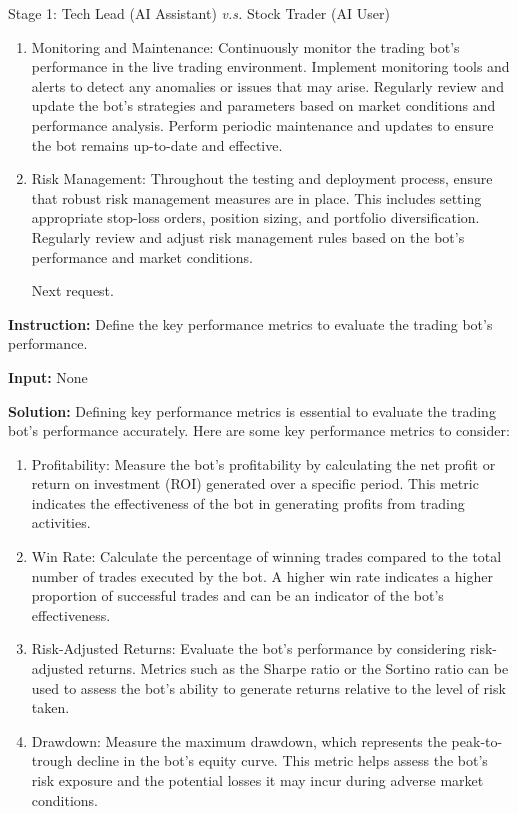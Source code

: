 \begin{AIBoxBreak}{Stage 1: Tech Lead (AI Assistant) \textit{v.s.} Stock Trader (AI User)}
\begin{enumerate}
\item  Monitoring and Maintenance: Continuously monitor the trading bot’s performance in the live trading environment. Implement monitoring tools and alerts to detect any anomalies or issues that may arise. Regularly review and update the bot’s strategies and parameters based on market conditions and performance analysis. Perform periodic maintenance and updates to ensure the bot remains up-to-date and effective.

\item  Risk Management: Throughout the testing and deployment process, ensure that robust risk management measures are in place. This includes setting appropriate stop-loss orders, position sizing, and portfolio diversification. Regularly review and adjust risk management rules based on the bot’s performance and market conditions.

Next request.
\end{enumerate}


\usermsg

\textbf{Instruction:} Define the key performance metrics to evaluate the trading bot’s performance.

\textbf{Input:} None


\assistantmsg

\textbf{Solution:} Defining key performance metrics is essential to evaluate the trading bot’s performance accurately. Here are some key performance metrics to consider:

\begin{enumerate}
\item  Profitability: Measure the bot’s profitability by calculating the net profit or return on investment (ROI) generated over a specific period. This metric indicates the effectiveness of the bot in generating profits from trading activities.

\item  Win Rate: Calculate the percentage of winning trades compared to the total number of trades executed by the bot. A higher win rate indicates a higher proportion of successful trades and can be an indicator of the bot’s effectiveness.

\item  Risk-Adjusted Returns: Evaluate the bot’s performance by considering risk-adjusted returns. Metrics such as the Sharpe ratio or the Sortino ratio can be used to assess the bot’s ability to generate returns relative to the level of risk taken.

\item  Drawdown: Measure the maximum drawdown, which represents the peak-to-trough decline in the bot’s equity curve. This metric helps assess the bot’s risk exposure and the potential losses it may incur during adverse market conditions.


\end{enumerate}
\end{AIBoxBreak}
